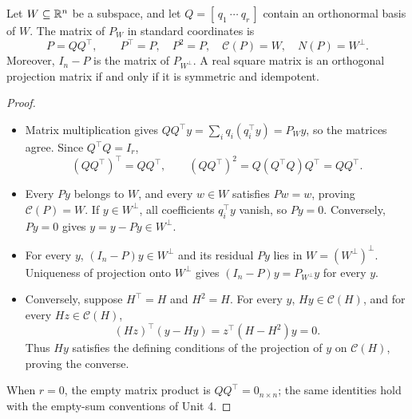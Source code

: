 \begin{proposition}\label{prop:06:projector}
Let \(W\subseteq\mathbb R^n\) be a subspace, and let
\(Q=[\,q_1\ \cdots\ q_r\,]\) contain an orthonormal basis of \(W\).
The matrix of \(P_W\) in standard coordinates is
\[
P=QQ^\top,\qquad P^\top=P,\quad P^2=P,\quad
\mathcal C(P)=W,\quad N(P)=W^\perp.
\]
Moreover, \(I_n-P\) is the matrix of \(P_{W^\perp}\).
A real square matrix is an orthogonal projection matrix if and only if
it is symmetric and idempotent.
\end{proposition}
\begin{proof}
\begin{itemize}
\item Matrix multiplication gives
  \(QQ^\top y=\sum_i q_i(q_i^\top y)=P_Wy\), so the matrices agree.
  Since \(Q^\top Q=I_r\),
  \[
  (QQ^\top)^\top=QQ^\top,\qquad
  (QQ^\top)^2=Q(Q^\top Q)Q^\top=QQ^\top.
  \]
\item Every \(Py\) belongs to \(W\), and every \(w\in W\) satisfies
  \(Pw=w\), proving \(\mathcal C(P)=W\).
  If \(y\in W^\perp\), all coefficients \(q_i^\top y\) vanish, so \(Py=0\).
  Conversely, \(Py=0\) gives \(y=y-Py\in W^\perp\).
\item For every \(y\), \((I_n-P)y\in W^\perp\) and its residual
  \(Py\) lies in \(W=(W^\perp)^\perp\). Uniqueness of projection onto
  \(W^\perp\) gives \((I_n-P)y=P_{W^\perp}y\) for every \(y\).
\item Conversely, suppose \(H^\top=H\) and \(H^2=H\).
  For every \(y\), \(Hy\in\mathcal C(H)\), and for every \(Hz\in\mathcal C(H)\),
  \[
  (Hz)^\top(y-Hy)=z^\top(H-H^2)y=0.
  \]
  Thus \(Hy\) satisfies the defining conditions of the projection
  of \(y\) on \(\mathcal C(H)\), proving the converse.
\end{itemize}
When \(r=0\), the empty matrix product is \(QQ^\top=0_{n\times n}\);
the same identities hold with the empty-sum conventions of Unit 4.
\end{proof}

